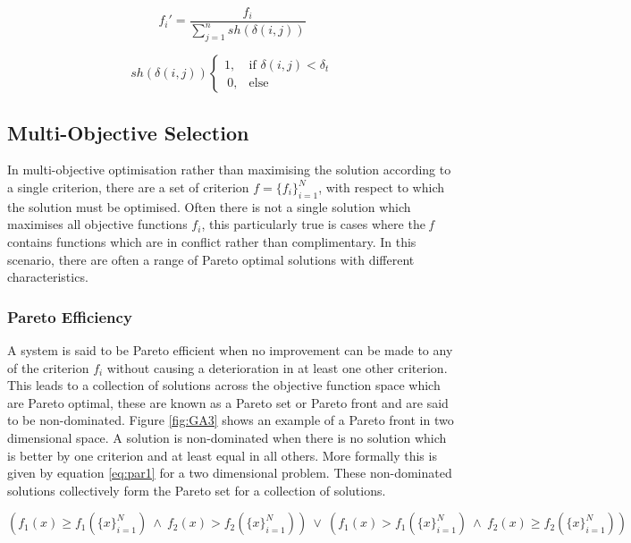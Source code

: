 		\begin{equation}\label{eq:NEAT2}	f_i' = \frac{f_i}{\sum_{j=1}^nsh(\delta(i,j))}
		\end{equation}

		\begin{equation}\label{eq:NEAT21} sh(\delta(i,j)) \begin{cases}
							1, & \text{if } \delta(i,j) < \delta_t\\\
							0, & \text{else}\end{cases} \end{equation}




	\subsection{Multi-Objective Selection}
		In multi-objective optimisation rather than maximising the solution according to a single criterion, there are a set of criterion \(f = \{f_i\}_{i=1}^N\), with respect to which the solution must be optimised. Often there is not a single solution which maximises all objective functions \(f_i\), this particularly true is cases where the \textit{f} contains functions which are in conflict rather than complimentary. In this scenario, there are often a range of Pareto optimal solutions with different characteristics.\cite{pareto}

		\subsubsection{Pareto Efficiency}

			A system is said to be Pareto efficient when no improvement can be made to any of the criterion \(f_i\) without causing a deterioration in at least one other criterion. This leads to a collection of solutions across the objective function space which are Pareto optimal, these are known as a Pareto set or Pareto front and are said to be non-dominated. Figure \ref{fig:GA3} shows an example of a Pareto front in two dimensional space.
			A solution is non-dominated when there is no solution which is better by one criterion and at least equal in all others. More formally this is given by equation \ref{eq:par1} for a two dimensional problem. These non-dominated solutions collectively form the Pareto set for a collection of solutions.


			\begin{equation}\label{eq:par1}
				(f_1(x) \geq f_1(\{x\}_{i=1}^N) ~\land~ f_2(x) > f_2(\{x\}_{i=1}^N))
				~\lor~
				(f_1(x) > f_1(\{x\}_{i=1}^N) ~\land~ f_2(x) \geq f_2(\{x\}_{i=1}^N))
			\end{equation}



